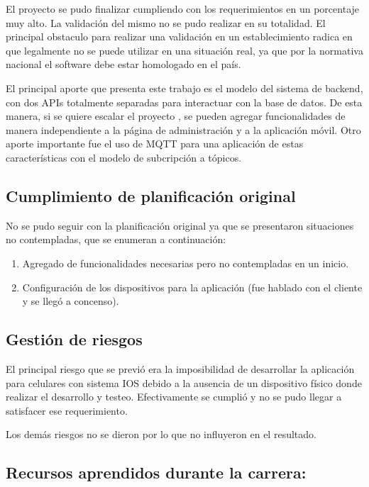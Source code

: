 El proyecto se pudo finalizar cumpliendo con los requerimientos en un porcentaje muy alto. La validación del mismo no se pudo realizar en su totalidad. El principal obstaculo para realizar una validación en un establecimiento radica en que legalmente no se puede utilizar en una situación real, ya que por la normativa nacional el software debe estar homologado en el país.  


El principal aporte que presenta este trabajo es el modelo del sistema de backend, con dos APIs totalmente separadas para interactuar con la base de datos. De esta manera, si se quiere escalar el proyecto , se pueden agregar funcionalidades de manera independiente a la página de administración y a la aplicación móvil. Otro aporte importante fue el uso de MQTT para una aplicación de estas características con el modelo de subcripción a tópicos.




\subsection{Cumplimiento de planificación original}

No se pudo seguir con la planificación original ya que se presentaron situaciones no contempladas, que se enumeran a continuación:
\begin{enumerate}
\item Agregado de funcionalidades necesarias pero no contempladas en un inicio.
\item Configuración de los dispositivos para la aplicación (fue hablado con el cliente y se llegó a concenso).

\end{enumerate}


\subsection{Gestión de riesgos}

El principal riesgo que se previó era la imposibilidad de desarrollar la aplicación para celulares con sistema IOS debido a la ausencia de un dispositivo físico donde realizar el desarrollo y testeo. Efectivamente se cumplió y no se pudo llegar a satisfacer ese requerimiento.

Los demás riesgos no se dieron por lo que no influyeron en el resultado.

\subsection{Recursos aprendidos durante la carrera:}

